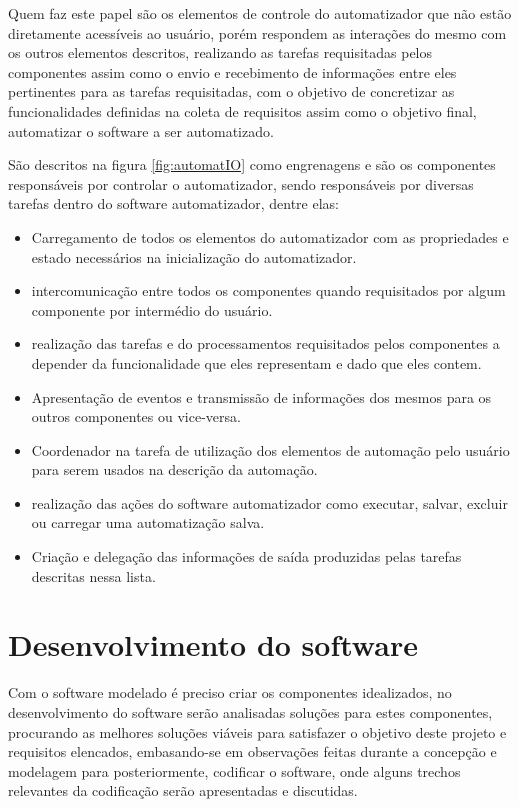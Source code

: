 \documentclass[tg]{mdtufsm}
\begin{document}
                    Quem faz este papel são os elementos de controle do automatizador que não estão diretamente acessíveis ao usuário, porém respondem as interações do mesmo com os outros elementos descritos, realizando as tarefas requisitadas pelos componentes assim como o envio e recebimento de informações entre eles pertinentes para as tarefas requisitadas, com o objetivo de concretizar as funcionalidades definidas na coleta de requisitos assim como o objetivo final, automatizar o software a ser automatizado.

                    São descritos na figura \ref{fig:automatIO} como engrenagens e são os componentes responsáveis por controlar o automatizador, sendo responsáveis por diversas tarefas dentro do software automatizador, dentre elas:

                    \begin{itemize}
                        \item Carregamento de todos os elementos do automatizador com as propriedades e estado necessários na inicialização do automatizador.
                        \item intercomunicação entre todos os componentes quando requisitados por algum componente por intermédio do usuário.
                        \item realização das tarefas e do processamentos requisitados pelos componentes a depender da funcionalidade que eles representam e dado que eles contem.
                        \item Apresentação de eventos e transmissão de informações dos mesmos para os outros componentes ou vice-versa.
                        \item Coordenador na tarefa de utilização dos elementos de automação pelo usuário para serem usados na descrição da automação.
                        \item realização das ações do software automatizador como executar, salvar, excluir ou carregar uma automatização salva.
                        \item Criação e delegação das informações de saída produzidas pelas tarefas descritas nessa lista.
                    \end{itemize}

        \section {Desenvolvimento do software}

            Com o software modelado é preciso criar os componentes idealizados, no desenvolvimento do software serão analisadas soluções para estes componentes, procurando as melhores soluções viáveis para satisfazer o objetivo deste projeto e requisitos elencados, embasando-se em observações feitas durante a concepção e modelagem para posteriormente, codificar o software, onde alguns trechos relevantes da codificação serão apresentadas e discutidas.
\end{document}
